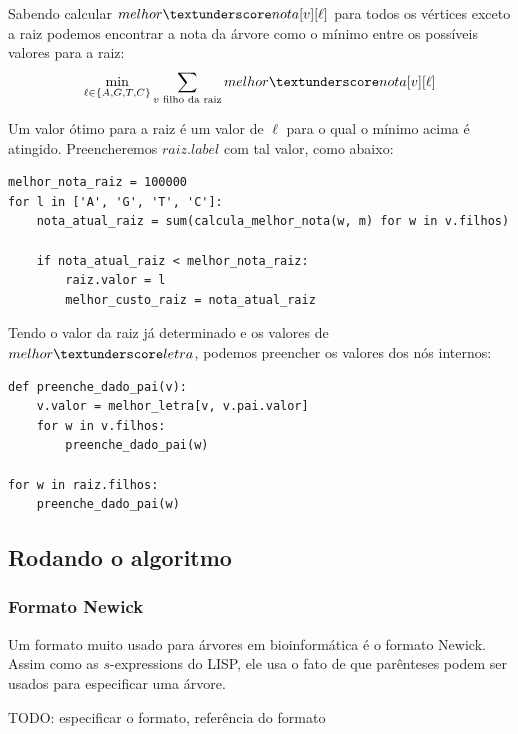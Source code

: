 \documentclass[11pt]{article}
\newcommand{\tu}{\textunderscore}
\begin{document}
Sabendo calcular $melhor \tu nota[v][\ell]$ para todos os vértices
exceto a raiz podemos encontrar a nota da árvore como o mínimo entre
os possíveis valores para a raiz:
\[ \min_{\ell \in \{A, G, T, C\}} \sum_{v \text{ filho da raiz}}
melhor \tu nota[v][\ell]\]

Um valor ótimo para a raiz é um valor de $\ell$ para o qual o mínimo
acima é atingido. Preencheremos $raiz.label$ com tal valor, como
abaixo:
\begin{verbatim}
melhor_nota_raiz = 100000
for l in ['A', 'G', 'T', 'C']:
    nota_atual_raiz = sum(calcula_melhor_nota(w, m) for w in v.filhos)

    if nota_atual_raiz < melhor_nota_raiz:
        raiz.valor = l
        melhor_custo_raiz = nota_atual_raiz
\end{verbatim}

Tendo o valor da raiz já determinado e os valores de $melhor \tu
letra$, podemos preencher os valores dos nós internos:

\begin{verbatim}
def preenche_dado_pai(v):
    v.valor = melhor_letra[v, v.pai.valor]
    for w in v.filhos:
        preenche_dado_pai(w)

for w in raiz.filhos:
    preenche_dado_pai(w)
\end{verbatim}


\subsection{Rodando o algoritmo}
\label{sec-2-3}

\subsubsection{Formato Newick}
\label{sec-2-3-1}

Um formato muito usado para árvores em bioinformática é o formato
Newick. Assim como as $s$-expressions do LISP, ele usa o fato de que
parênteses podem ser usados para especificar uma árvore.

TODO: especificar o formato, referência do formato
\end{document}

